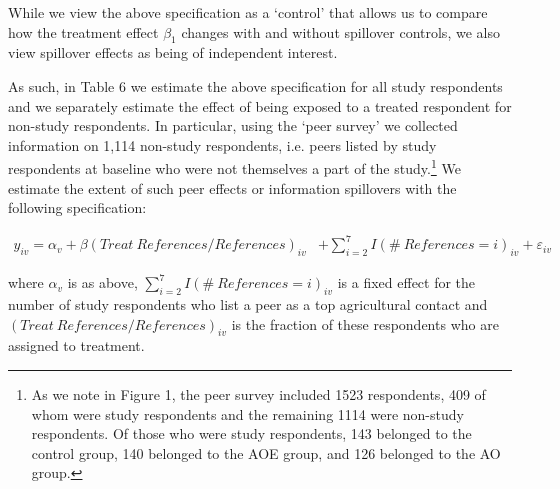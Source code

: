 \documentclass[12pt]{article}
\begin{document}
{{\normalsize While we view the above specification as a `control' that allows us to compare how the treatment effect $\beta_{1}$ changes with and without spillover controls, we also view spillover effects as being of independent interest. } 

{\normalsize As such, in Table 6 we estimate the above specification for all study respondents and we separately estimate the effect of being exposed to a treated respondent for non-study respondents. 
In particular, using the `peer survey' we collected information 
on 1,114 non-study respondents, i.e. peers listed by study respondents at baseline who were not themselves a part of the study.\footnote{As we note in Figure 1, the peer survey included 1523 respondents, 409 of whom were study respondents and the remaining 1114 were non-study respondents. Of those who were study respondents, 143 belonged to the control group, 140 belonged to the AOE group, and 126 belonged to the AO group.} We estimate the extent of such peer effects or information spillovers with the following specification:}

{\normalsize 
\begin{align}  \label{sd4}
y_{iv} =\alpha_{v}+\beta (Treat\ References/References)_{iv} & + \sum_{i=2}^7 I(\#\ References = i)_{iv} + \varepsilon_{iv} & 
\end{align}
}

{\normalsize where $\alpha_{v}$ is as above, $\sum_{i=2}^7 I(\#\ References
= i)_{iv}$ is a fixed effect for the number of study respondents who list a peer 
as a top agricultural contact and $(Treat\ References/References)_{iv}$ is the fraction of these respondents who are assigned to treatment. }

}
\end{document}
